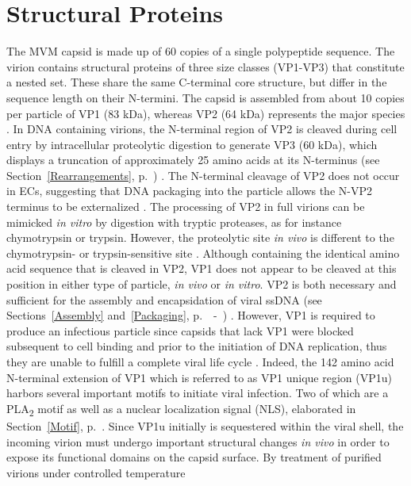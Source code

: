 
\section{Structural Proteins}
\label{VPs}

The MVM capsid is made up of 60 copies of a single polypeptide sequence. The virion contains structural proteins of three size classes (VP1-VP3) that constitute a nested set. These share the same C-terminal core structure, but differ in the sequence length on their N-termini. The capsid is assembled from about 10 copies per particle of VP1 (83 kDa), whereas VP2 (64 kDa) represents the major species \cite{pmid988192}. In DNA containing virions, the N-terminal region of VP2 is cleaved during cell entry by intracellular proteolytic digestion to generate VP3 (60 kDa), which displays a truncation of approximately 25 amino acids at its N-terminus (see Section~\ref{Rearrangements}, p.~\pageref{Rearrangements}) \cite{pmid864702, pmid1448928, pmid982825, pmid9770425}. The N-terminal cleavage of VP2 does not occur in ECs, suggesting that DNA packaging into the particle allows the N-VP2 terminus to be externalized \cite{pmid3296697, pmid6481856, pmid864702}. The processing of VP2 in full virions can be mimicked \textit{in vitro} by digestion with tryptic proteases, as for instance chymotrypsin or trypsin. However, the proteolytic site \textit{in vivo} is different to the chymotrypsin- or trypsin-sensitive site \cite{pmid6481856, pmid864702, pmid1448928}. Although containing the identical amino acid sequence that is cleaved in VP2, VP1 does not appear to be cleaved at this position in either type of particle, \textit{in vivo} or \textit{in vitro}. VP2 is both necessary and sufficient for the assembly and encapsidation of viral ssDNA (see Sections~\ref{Assembly} and~\ref{Packaging}, p.~\pageref{Assembly}~-~\pageref{Packaging}) \cite{pmid10662625}. However, VP1 is required to produce an infectious particle since capsids that lack VP1 were blocked subsequent to cell binding and prior to the initiation of DNA replication, thus they are unable to fulfill a complete viral life cycle \cite{pmid8416366}. Indeed, the 142 amino acid N-terminal extension of VP1 which is referred to as VP1 unique region (VP1u) harbors several important motifs to initiate viral infection. Two of which are a PLA\textsubscript{2} motif as well as a nuclear localization signal (NLS), elaborated in Section~\ref{Motif}, p.~\pageref{Motif}. Since VP1u initially is sequestered within the viral shell, the incoming virion must undergo important structural changes \textit{in vivo} in order to expose its functional domains on the capsid surface. By treatment of purified virions under controlled temperature 